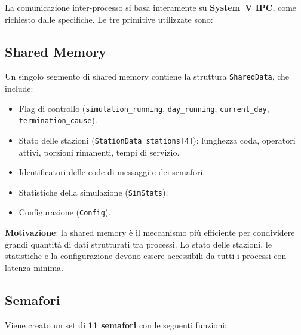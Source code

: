 \documentclass[a4paper,12pt]{article}
\begin{document}
La comunicazione inter-processo si basa interamente su \textbf{System~V IPC},
come richiesto dalle specifiche. Le tre primitive utilizzate sono:

\subsection{Shared Memory}

Un singolo segmento di shared memory contiene la struttura
\texttt{SharedData}, che include:

\begin{itemize}
  \item Flag di controllo (\texttt{simulation\_running},
        \texttt{day\_running}, \texttt{current\_day},
        \texttt{termination\_cause}).
  \item Stato delle stazioni (\texttt{StationData stations[4]}):
        lunghezza coda, operatori attivi, porzioni rimanenti,
        tempi di servizio.
  \item Identificatori delle code di messaggi e dei semafori.
  \item Statistiche della simulazione (\texttt{SimStats}).
  \item Configurazione (\texttt{Config}).
\end{itemize}

\textbf{Motivazione}: la shared memory è il meccanismo più efficiente
per condividere grandi quantità di dati strutturati tra processi.
Lo stato delle stazioni, le statistiche e la configurazione devono
essere accessibili da tutti i processi con latenza minima.

\subsection{Semafori}

Viene creato un set di \textbf{11 semafori} con le seguenti funzioni:
\end{document}
